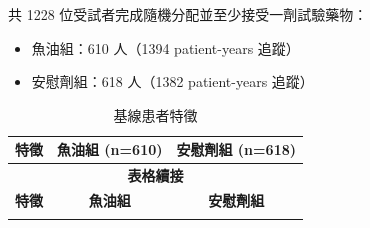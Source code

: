 \documentclass[12pt,a4paper]{article}
\begin{document}
共 1228 位受試者完成隨機分配並至少接受一劑試驗藥物：
\begin{itemize}
    \item 魚油組：610 人（1394 patient-years 追蹤）
    \item 安慰劑組：618 人（1382 patient-years 追蹤）
\end{itemize}

\begin{longtable}{p{6cm}cc}
\caption{基線患者特徵} \\
\toprule
\textbf{特徵} & \textbf{魚油組 (n=610)} & \textbf{安慰劑組 (n=618)} \\
\midrule
\endfirsthead

\multicolumn{3}{c}{\textbf{表格續接}} \\
\toprule
\textbf{特徵} & \textbf{魚油組} & \textbf{安慰劑組} \\
\midrule
\endhead

\bottomrule
\endfoot


\end{longtable}
\end{document}
